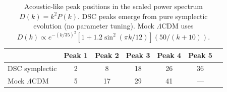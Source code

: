 \begin{table}[htbp]
\centering
\caption{Acoustic-like peak positions in the scaled power spectrum $D(k) = k^2 P(k)$.
  DSC peaks emerge from pure symplectic evolution (no parameter tuning).
  Mock $\Lambda$CDM uses $D(k) \propto e^{-(k/35)^2}[1 + 1.2\sin^2(\pi k/12)](50/(k+10))$.}
\label{tab:peaks}
\begin{tabular}{lcccccc}
\toprule
 & Peak 1 & Peak 2 & Peak 3 & Peak 4 & Peak 5 \\
\midrule
DSC symplectic & 2 & 8 & 18 & 26 & 36 \\
Mock $\Lambda$CDM & 5 & 17 & 29 & 41 & --- \\
\bottomrule
\end{tabular}
\end{table}
